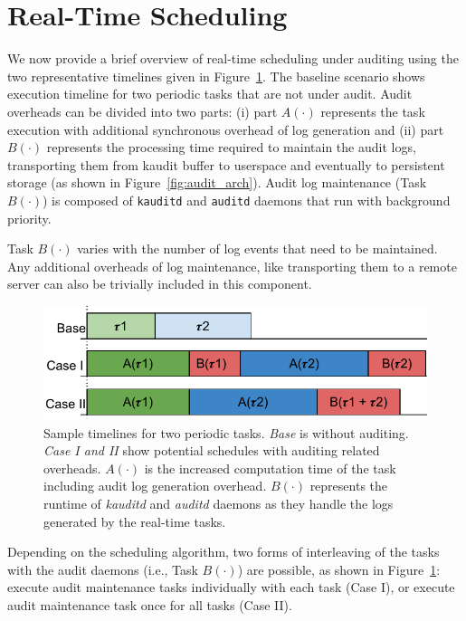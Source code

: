 \section{Real-Time Scheduling}
\label{sec:sched}


  We now provide a brief overview of real-time scheduling under auditing using the two representative timelines given in Figure~\ref{fig:timelines}.
  The baseline scenario shows execution timeline for two periodic tasks that are not under audit.
  Audit overheads can be divided into two parts: (i)
  part  $A(\cdot)$ represents the task execution with additional synchronous overhead of log generation and  (ii) part 
  $B(\cdot)$ represents the processing time required to maintain  the audit logs, transporting them from kaudit buffer to userspace and eventually to persistent storage (as shown in Figure~\ref{fig:audit_arch}).
  Audit log maintenance (Task $B(\cdot)$) is composed of \texttt{kauditd} and \texttt{auditd} daemons that run with background priority. 
  
  Task $B(\cdot)$ varies with the number of log events that need to be maintained.
  Any additional overheads of log maintenance, like transporting them to a remote server can also be trivially included in this component.

  \begin{figure}[t!]
    \centering 
      \includegraphics[width=.8\linewidth]{fig/timelines.pdf}
      \caption{\label{fig:timelines}Sample timelines for two periodic tasks. \textit{Base} is without auditing. \textit{Case I and II} show potential schedules with auditing related overheads. $A(\cdot)$ is the increased computation time of the task including audit log generation overhead. $B(\cdot)$ represents the runtime of \textit{kauditd} and \textit{auditd} daemons as they handle the logs generated by the real-time tasks.}
    \end{figure} 
  
 Depending on the scheduling algorithm, two forms of interleaving of the tasks with the audit daemons (i.e., Task $B(\cdot)$) are possible, as shown in
Figure~\ref{fig:timelines}: execute audit maintenance tasks individually with each task (Case I), or execute audit maintenance task once for all tasks (Case II).

